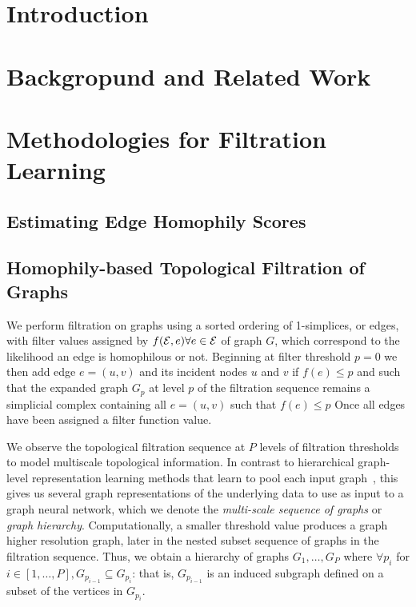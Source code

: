 \documentclass[letterpaper]{article} %
\begin{document}
\section{Introduction}

\label{Sec:Introduction}

%
%
\section{Backgropund and Related Work}

\label{Sec:background}





%
%
\section{Methodologies for Filtration Learning}
\label{Sec:method}


\subsection{Estimating Edge Homophily Scores}

\label{sSec:edge_homophily_scores}

\subsection{Homophily-based Topological Filtration of Graphs}

\label{sSec:topo_filtration}

We perform filtration on graphs using a sorted ordering of 1-simplices, or edges, with filter values assigned by $f(\mathcal{E}, e)\forall e\in \mathcal{E}$ of graph $G$, which correspond to the likelihood an edge is homophilous or not. Beginning at filter threshold $p=0$ we then add edge $e=(u,v)$ and its incident nodes $u$ and $v$ if $f(e)\leq p $  and such that the expanded graph $G_p$ at level $p$ of the filtration sequence remains a simplicial complex containing all $e=(u,v)$ such that $f(e)\leq p$  Once all edges have been assigned a filter function value. 

We observe the topological filtration sequence at $P$ levels of filtration thresholds to model multiscale topological information. In contrast to hierarchical graph-level representation learning methods that learn to pool each input graph~\cite{ying2018hierarchical}, this gives us several graph representations of the underlying data to use as input to a graph neural network, which we denote the \textit{multi-scale sequence of graphs} or \textit{graph hierarchy}. Computationally, a smaller threshold value produces a graph higher resolution graph, later in the nested subset sequence of graphs in the filtration sequence. Thus, we obtain a hierarchy of graphs $G_1, \ldots, G_P$ where  $\forall p_i$ for $i \in [1, \ldots, P], G_{p_{i-1}} \subseteq G_{p_i}$: that is, $G_{p_{i-1}}$ is an induced subgraph defined on a subset of the vertices in $G_{p_i}$. %
\end{document}
